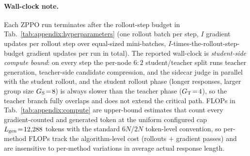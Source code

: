 \paragraph{Wall-clock note.} Each ZPPO run terminates after the rollout-step budget in Tab.~\ref{tab:appendix:hyperparameters} (one rollout batch per step, $I$ gradient updates per rollout step over equal-sized mini-batches, $I$-times-the-rollout-step-budget gradient updates per run in total). The reported wall-clock is \emph{student-side compute bound}: on every step the per-node $6\!:\!2$ student/teacher split runs teacher generation, teacher-side candidate compression, and the sidecar judge in parallel with the student rollout, and the student rollout phase (longer responses, larger group size $G_{\rm S}\!=\!8$) is always slower than the teacher phase ($G_{\rm T}\!=\!4$), so the teacher branch fully overlaps and does not extend the critical path. FLOPs in Tab.~\ref{tab:appendix:compute} are upper-bound estimates that count every gradient-counted and generated token at the uniform configured cap $L_{\rm gen}\!=\!12{,}288$ tokens with the standard $6N$/$2N$ token-level convention, so per-method FLOPs track the algorithm-level cost (rollouts $+$ gradient passes) and are insensitive to per-method variations in average actual response length.



